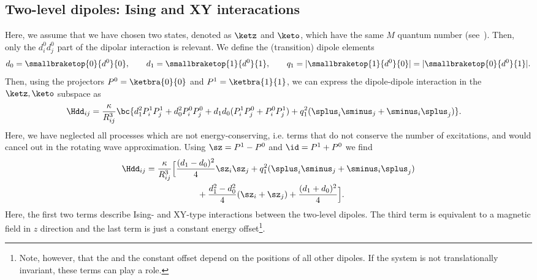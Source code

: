 \subsection{Two-level dipoles: Ising and XY interacations}
Here, we assume that we have chosen two states, denoted as $\ketz$ and $\keto$, which have the
same $M$ quantum number (see~).
Then, only the $d^0_id^0_j$ part of the dipolar interaction is relevant.
We define the (transition) dipole elements
\begin{align*}
    d_0 = \smallbraketop{0}{d^0}{0},\qquad
    d_1 = \smallbraketop{1}{d^0}{1},\qquad
    q_1 = |\smallbraketop{1}{d^0}{0}| = |\smallbraketop{0}{d^0}{1}|.
\end{align*}
Then, using the projectors $P^0 = \ketbra{0}{0}$ and $P^1 = \ketbra{1}{1}$, we can express the
dipole-dipole interaction  in the $\ketz, \keto$ subspace as
\begin{align*}
    \Hdd_{ij} &= \frac{\kappa}{R_{ij}^3} \bc {d_1^2 P^1_i P^1_j + d_0^2 P^0_i P^0_j + d_1d_0 (P^1_i P^0_j + P^0_i P^1_j) + q_1^2 (\splus_i \sminus_j + \sminus_i \splus_j) }.
\end{align*}
Here, we have neglected all processes which are not energy-conserving,
i.e. terms that do not conserve the number of excitations, and would
cancel out in the rotating wave approximation.
Using $\sz = P^1 - P^0$ and $\id = P^1 + P^0$ we find
\begin{align*}
    \Hdd_{ij} &= \frac{\kappa}{R_{ij}^3} \Big[ \frac{(d_1-d_0)^2}{4} \sz_i \sz_j  + q_1^2 (\splus_i \sminus_j + \sminus_i \splus_j)\\
              &\qquad\qquad\qquad + \frac{d_1^2 - d_0^2}{4} (\sz_i + \sz_j)  + \frac{(d_1+d_0)^2}{4} \Big].
\end{align*}
Here, the first two terms describe Ising- and XY-type interactions between the two-level dipoles. The third term is equivalent to a magnetic field in $z$ direction and the last term is just a constant energy offset\footnote{Note, however, that the  and the constant offset depend on the positions of all other dipoles. If the system is not translationally invariant, these terms can play a role.}.

